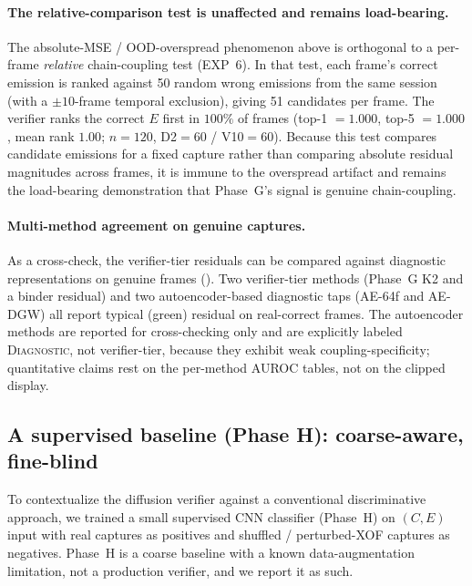 \paragraph{The relative-comparison test is unaffected and remains load-bearing.}
The absolute-MSE / OOD-overspread phenomenon above is orthogonal to a per-frame \emph{relative} chain-coupling test (EXP~6). In that test, each frame's correct emission is ranked against 50 random wrong emissions from the same session (with a $\pm 10$-frame temporal exclusion), giving 51 candidates per frame. The verifier ranks the correct $E$ first in $100\%$ of frames (top-1 $=1.000$, top-5 $=1.000$, mean rank $1.00$; $n=120$, D2$=60$ / V10$=60$). Because this test compares candidate emissions for a fixed capture rather than comparing absolute residual magnitudes across frames, it is immune to the overspread artifact and remains the load-bearing demonstration that Phase~G's signal is genuine chain-coupling.

\paragraph{Multi-method agreement on genuine captures.}
As a cross-check, the verifier-tier residuals can be compared against diagnostic representations on genuine frames (). Two verifier-tier methods (Phase~G K2 and a binder residual) and two autoencoder-based diagnostic taps (AE-64f and AE-DGW) all report typical (green) residual on real-correct frames. The autoencoder methods are reported for cross-checking only and are explicitly labeled \textsc{Diagnostic}, not verifier-tier, because they exhibit weak coupling-specificity; quantitative claims rest on the per-method AUROC tables, not on the clipped display.

\subsection{A supervised baseline (Phase H): coarse-aware, fine-blind}
\label{sec:redteam_phaseh}

To contextualize the diffusion verifier against a conventional discriminative approach, we trained a small supervised CNN classifier (Phase~H) on $(C,E)$ input with real captures as positives and shuffled / perturbed-XOF captures as negatives. Phase~H is a coarse baseline with a known data-augmentation limitation, not a production verifier, and we report it as such.

